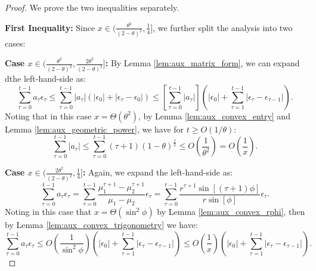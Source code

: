 \begin{proof}
We prove the two inequalities separately.

\noindent \textbf{First Inequality:} Since $x \in (\frac{\theta^2}{(2-\theta)^2}, 
\frac{1}{4}]$, we further split the analysis into two cases:

\noindent \textbf{Case $x \in (\frac{\theta^2}{(2-\theta)^2}, \frac{2\theta^2}{(2-\theta)^2}]$:}
By Lemma \ref{lem:aux_matrix_form}, we can expand dthe left-hand-side as:
\begin{equation*}
\sum_{\tau = 0}^{t-1} a_\tau  \epsilon_\tau
\le \sum_{\tau = 0}^{t-1} |a_\tau|  (|\epsilon_0| + |\epsilon_\tau - \epsilon_0|)
\le \left[\sum_{\tau = 0}^{t-1} |a_\tau|\right]  \left(|\epsilon_0| + \sum_{\tau = 1}^{t-1}|\epsilon_\tau - \epsilon_{\tau -1}|\right).
\end{equation*}
Noting that in this case $x = \Theta(\theta^2)$, by Lemma \ref{lem:aux_convex_entry} and Lemma \ref{lem:aux_geometric_power}, we have for $t \ge O(1/\theta)$:
\begin{equation*}
\sum_{\tau = 0}^{t-1} |a_\tau|
 \le \sum_{\tau = 0}^{t-1} (\tau+1)(1-\theta)^{\frac{\tau}{2}}
 \le O(\frac{1}{\theta^2}) = O(\frac{1}{x}).
\end{equation*}

\noindent \textbf{Case $x \in (\frac{2\theta^2}{(2-\theta)^2}, \frac{1}{4}]$:}
Again, we expand the left-hand-side as:
\begin{equation*}
\sum_{\tau = 0}^{t-1} a_\tau  \epsilon_\tau
= \sum_{\tau =0}^{t-1} \frac{\mu_1^{\tau+1} -  \mu_2^{\tau+1}}{\mu_1 -\mu_2}\epsilon_\tau
= \sum_{\tau =0}^{t-1}\frac{r^{\tau+1}\sin[(\tau+1)\phi]}{r\sin[\phi]} \epsilon_\tau.
\end{equation*}
Noting in this case that $x = \Theta(\sin^2\phi)$ by Lemma \ref{lem:aux_convex_rphi}, then by Lemma \ref{lem:aux_convex_trigonometry} we have:
\begin{equation*}
\sum_{\tau = 0}^{t-1} a_\tau  \epsilon_\tau 
\le O(\frac{1}{\sin^2\phi})\left(|\epsilon_0| + \sum_{\tau = 1}^{t-1}|\epsilon_\tau - \epsilon_{\tau -1}|\right)
\le O(\frac{1}{x})\left(|\epsilon_0| + \sum_{\tau = 1}^{t-1}|\epsilon_\tau - \epsilon_{\tau -1}|\right).
\end{equation*}


\end{proof}
